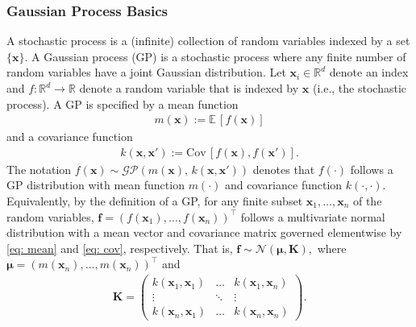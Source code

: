 \documentclass[journal=jacsat,manuscript=article, ]{achemso}
\newcommand{\kjnote}[1]{{\color{Blue} (\texttt{kjnote}: #1)}}
\newcommand{\alltodo}[1]{{\color{Cyan} (\texttt{alltodo}: #1)}}
\newcommand{\reals}{\ensuremath{\mathbb{R}}}
\newcommand{\xvec}{\ensuremath{\mathbf{x}}}
\newcommand{\adnote}[1]{{\color{OliveGreen} (\texttt{adnote}: #1)}}
\newcommand{\mcnote}[1]{{\color{Plum} (\texttt{mcnote}: #1)}}
\begin{document}

\subsubsection{Gaussian Process Basics}
A stochastic process is a (infinite) collection of random variables indexed by a set $\{\xvec\}$. A Gaussian process (GP) is a stochastic process where any finite number of random variables have a joint Gaussian distribution. Let $\xvec_i \in \reals^d$ denote an index and $f: \reals^d \rightarrow \reals$ denote a random variable that is indexed by $\xvec$ (i.e., the stochastic process). A GP is specified by a mean function
 \begin{gather}
     m(\xvec) := \mathbb{E}\,[f(\xvec)] \label{eq: mean}
 \end{gather}
 and a covariance function
 \begin{gather}
     k(\xvec, \xvec') := \text{Cov}\,[f(\xvec), f(\mathbf{x'})]. \label{eq: cov}
 \end{gather}
 The notation $f(\xvec)\sim \mathcal{GP}(m(\xvec), \, k(\xvec,\xvec'))$
 denotes that $f(\cdot)$ follows a GP distribution with mean function $m(\cdot)$ and covariance function $k(\cdot,\cdot)$. Equivalently, by the definition of a GP, for any finite subset $\xvec_1, \dots, \xvec_n$ of the random variables, $\mathbf{f}=(f(\xvec_1),  \dots, f(\xvec_n))^\intercal$ follows a multivariate normal distribution with a mean vector and covariance matrix governed elementwise by \eqref{eq: mean} and \eqref{eq: cov}, respectively. That is, $\mathbf{f} \sim \mathcal{N}(\boldsymbol{\mu}, \mathbf{K}),$ where $\boldsymbol{\mu} = (m(\xvec_n), \dots, m(\xvec_n))^\intercal$ and
 \begin{gather} 
     \mathbf{K} = 
     \left(
     \begin{matrix}
         k(\xvec_1,\xvec_1) & \dots & k(\xvec_1,\xvec_n) \\
         \vdots & \ddots & \vdots \\
         k(\xvec_n,\xvec_1) & \dots & k(\xvec_n,\xvec_n)
     \end{matrix}\right).
 \end{gather}
\end{document}
